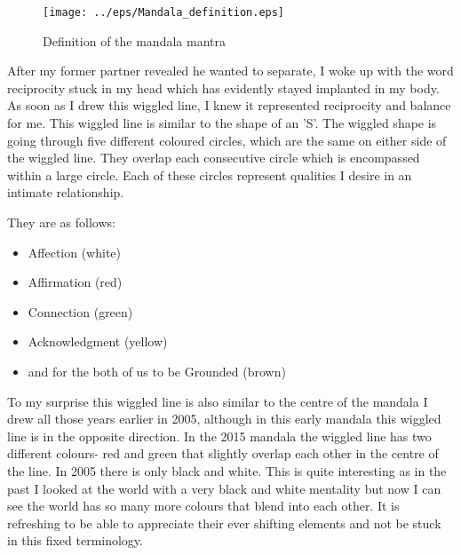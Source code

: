 \begin{figure}[htbp]
\begin{center}
\texttt{[image: ../eps/Mandala\_definition.eps]}
\caption{Definition of the mandala mantra}
\label{label}
\end{center}
\end{figure}


After my former partner revealed he wanted to separate, I woke up with the word reciprocity stuck in my head which has evidently stayed implanted in my body. As soon as I drew this wiggled line, I knew it represented reciprocity and balance for me. This wiggled line is similar to the shape of an 'S'. The wiggled shape is going through five different coloured circles, which are the same on either side of the wiggled line. They overlap each consecutive circle which is encompassed within a large circle. Each of these circles represent qualities I desire in an intimate relationship. 

They are as follows:
\begin{itemize}
\item Affection (white)
\end{itemize}

\begin{itemize}
\item Affirmation (red)
\end{itemize}

\begin{itemize}
\item Connection (green)
\end{itemize}

\begin{itemize}
\item Acknowledgment (yellow)
\end{itemize}

\begin{itemize}
\item and for the both of us to be Grounded (brown)
\end{itemize}

    
To my surprise this wiggled line is also similar to the centre of the mandala I drew all those years earlier in 2005, although in this early mandala this wiggled line is in the opposite direction. In the 2015 mandala the wiggled line has two different colours- red and green that slightly overlap each other in the centre of the line. In 2005 there is only black and white. This is quite interesting as in the past I looked at the world with a very black and white mentality but now I can see the world has so many more colours that blend into each other. It is refreshing to be able to appreciate their ever shifting elements and not be stuck in this fixed terminology. 

